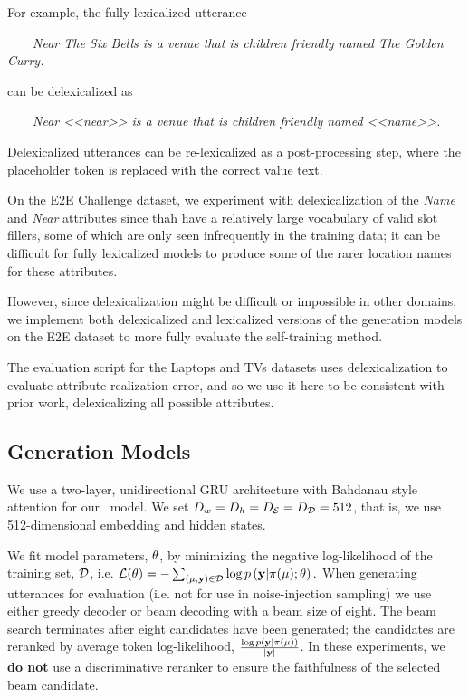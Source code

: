 For example, the fully lexicalized utterance 

\begin{center}\noindent~~~~\textit{Near The Six Bells is a venue that is children
friendly named The Golden Curry.}\end{center}

\noindent can be delexicalized as

\begin{center}\noindent ~~~~\textit{Near <<near>> is a venue that is children
friendly named <<name>>.}\end{center}

Delexicalized utterances can be re-lexicalized as a post-processing
step, where the placeholder token is replaced with the correct value text.

On the E2E Challenge dataset, we experiment with delexicalization of the 
\textit{Name} and \textit{Near} attributes since thah have a relatively large vocabulary of valid slot fillers, some of which are only seen  infrequently in the training data;
it can be difficult for fully lexicalized models to produce some of the 
rarer location names for these attributes. 

However, since delexicalization might be difficult or 
impossible in other domains, we implement both delexicalized and lexicalized
versions of the generation models on the E2E dataset to 
more fully evaluate the
self-training method.
   

The evaluation script for the Laptops and TVs datasets uses delexicalization
to evaluate attribute realization error, and so we use it here to be 
consistent with prior work, 
delexicalizing all possible attributes.
%



\subsection{Generation Models}

We use a two-layer, unidirectional GRU architecture with Bahdanau style
attention for our 
\sequencetosequence~model. We set $D_{w} = D_{h} = {D_\mathcal{E}} = {D_\mathcal{D}} = 512$, that is, we use 512-dimensional embedding and hidden states.

We fit model parameters, $\theta$, by minimizing the negative log-likelihood
of the training set, $\mathcal{D}$, i.e. $\mathcal{L}(\theta) = - \sum_{(\mu, \mathbf{y}) \in \mathcal{D}  }  \log p\left(\mathbf{y}|\pi(\mu);\theta\right).$
When generating utterances for evaluation (i.e. not for use in noise-injection sampling) we use either greedy decoder or beam decoding with a 
beam size of eight.
The beam search terminates after eight candidates have been generated;
the candidates are reranked by average token log-likelihood, $\frac{\log p\left(\mathbf{y}|\pi(\mu)\right)}{{\left\vert \mathbf{y} \right\vert}}$. In these experiments, we \textbf{do not} use a discriminative reranker to ensure the faithfulness of the 
selected beam candidate. 


